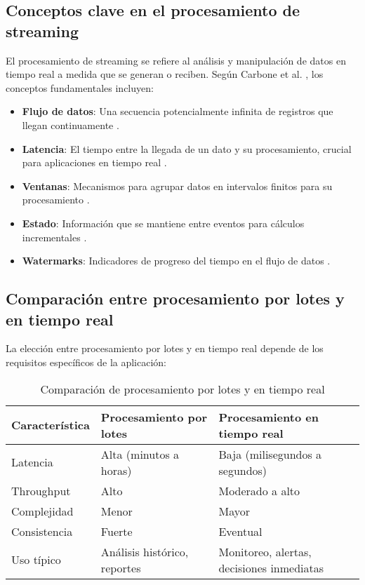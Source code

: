 \subsection{Conceptos clave en el procesamiento de streaming}

El procesamiento de streaming se refiere al análisis y manipulación de datos en tiempo real a medida que se generan o reciben. Según Carbone et al. \parencite{carbone2015apache}, los conceptos fundamentales incluyen:

\begin{itemize}
    \item \textbf{Flujo de datos}: Una secuencia potencialmente infinita de registros que llegan continuamente \parencite{akidau2015dataflow}.
    \item \textbf{Latencia}: El tiempo entre la llegada de un dato y su procesamiento, crucial para aplicaciones en tiempo real \parencite{akidau2015dataflow}.
    \item \textbf{Ventanas}: Mecanismos para agrupar datos en intervalos finitos para su procesamiento \parencite{akidau2015dataflow}.
    \item \textbf{Estado}: Información que se mantiene entre eventos para cálculos incrementales \parencite{carbone2015apache}.
    \item \textbf{Watermarks}: Indicadores de progreso del tiempo en el flujo de datos \parencite{akidau2015dataflow}.
\end{itemize}
\newpage
\subsection{Comparación entre procesamiento por lotes y en tiempo real}

La elección entre procesamiento por lotes y en tiempo real depende de los requisitos específicos de la aplicación:

\begin{table}[h]
\centering
\begin{tabular}{|p{3cm}|p{5cm}|p{5cm}|}
\hline
\textbf{Característica} & \textbf{Procesamiento por lotes} & \textbf{Procesamiento en tiempo real} \\
\hline
Latencia & Alta (minutos a horas) & Baja (milisegundos a segundos) \\
\hline
Throughput & Alto & Moderado a alto \\
\hline
Complejidad & Menor & Mayor \\
\hline
Consistencia & Fuerte & Eventual \\
\hline
Uso típico & Análisis histórico, reportes & Monitoreo, alertas, decisiones inmediatas \\
\hline
\end{tabular}
\caption{Comparación de procesamiento por lotes y en tiempo real}
\label{tab:batch_vs_streaming}
\end{table}

